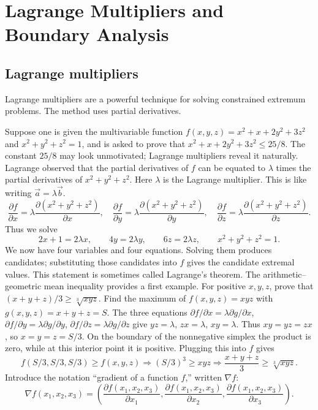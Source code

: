 \documentclass[11pt,a4paper]{article}
\begin{document}
\section*{Lagrange Multipliers and Boundary Analysis}
\subsection{Lagrange multipliers}
\setcounter{theorem}{38}\begin{lemma}\label{lemma:lb1-44}
Lagrange multipliers are a powerful technique for solving constrained extremum problems.
The method uses partial derivatives.
\end{lemma}
Suppose one is given the multivariable function
$f(x,y,z)=x^2+x+2y^2+3z^2$ and $x^2+y^2+z^2=1$, and is asked to prove that
$x^2+x+2y^2+3z^2\leq25/8$.
The constant $25/8$ may look unmotivated; Lagrange multipliers reveal it naturally.
Lagrange observed that the partial derivatives of $f$ can be equated to $\lambda$ times the partial derivatives of $x^2+y^2+z^2$.
Here $\lambda$ is the Lagrange multiplier. This is like writing $\vec a=\lambda\vec b$.
\[
\frac{\partial f}{\partial x}=\lambda\frac{\partial(x^2+y^2+z^2)}{\partial x},\quad
\frac{\partial f}{\partial y}=\lambda\frac{\partial(x^2+y^2+z^2)}{\partial y},\quad
\frac{\partial f}{\partial z}=\lambda\frac{\partial(x^2+y^2+z^2)}{\partial z}.
\]
Thus we solve
\[
2x+1=2\lambda x,\qquad4y=2\lambda y,\qquad6z=2\lambda z,
\qquad x^2+y^2+z^2=1.
\]
We now have four variables and four equations. Solving them produces candidates; substituting those candidates into $f$ gives the candidate extremal values.
This statement is sometimes called Lagrange's theorem.
The arithmetic--geometric mean inequality provides a first example.
For positive $x,y,z$, prove that $(x+y+z)/3\geq\sqrt[3]{xyz}$.
Find the maximum of $f(x,y,z)=xyz$ with $g(x,y,z)=x+y+z=S$.
The three equations $\partial f/\partial x=\lambda\partial g/\partial x$,
$\partial f/\partial y=\lambda\partial g/\partial y$,
$\partial f/\partial z=\lambda\partial g/\partial z$ give
$yz=\lambda$, $zx=\lambda$, $xy=\lambda$.
Thus $xy=yz=zx$, so $x=y=z=S/3$. On the boundary of the nonnegative
simplex the product is zero, while at this interior point it is positive.
Plugging this into $f$ gives
\[
f(S/3,S/3,S/3)\geq f(x,y,z)
\Longrightarrow(S/3)^3\geq xyz
\Longrightarrow\frac{x+y+z}{3}\geq\sqrt[3]{xyz}.
\]
Introduce the notation ``gradient of a function $f$,'' written $\nabla f$:
\[
\nabla f(x_1,x_2,x_3)=
\left(\frac{\partial f(x_1,x_2,x_3)}{\partial x_1},
\frac{\partial f(x_1,x_2,x_3)}{\partial x_2},
\frac{\partial f(x_1,x_2,x_3)}{\partial x_3}\right).
\]
\end{document}
